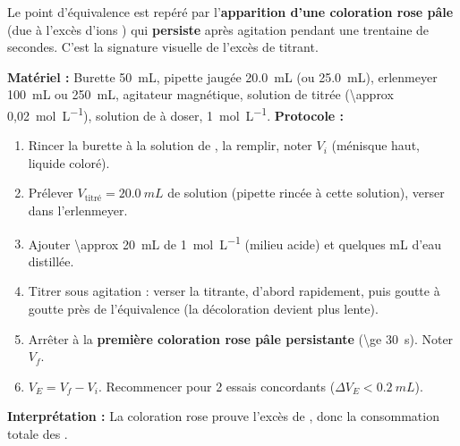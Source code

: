 \documentclass[11pt]{article}
\begin{document}
\begin{aretenir}
Le point d'équivalence est repéré par l'\textbf{apparition d'une coloration rose pâle} (due à l'excès d'ions ) qui \textbf{persiste} après agitation pendant une trentaine de secondes. C'est la signature visuelle de l'excès de titrant.
\end{aretenir}

\begin{experience}
\textbf{Matériel :} Burette \SI{50}{mL}, pipette jaugée \SI{20,0}{mL} (ou \SI{25,0}{mL}), erlenmeyer \SI{100}{mL} ou \SI{250}{mL}, agitateur magnétique, solution de  titrée (\SI{\approx 0,02}{mol.L^{-1}}), solution de  à doser,  \SI{1}{mol.L^{-1}}.
\textbf{Protocole :}
\begin{enumerate}
\item Rincer la burette à la solution de , la remplir, noter $V_i$ (ménisque haut, liquide coloré).
\item Prélever $V_{\text{titré}} = \SI{20,0}{mL}$ de solution  (pipette rincée à cette solution), verser dans l'erlenmeyer.
\item Ajouter \SI{\approx 20}{mL} de  \SI{1}{mol.L^{-1}} (milieu acide) et quelques mL d'eau distillée.
\item Titrer sous agitation : verser la titrante, d'abord rapidement, puis goutte à goutte près de l'équivalence (la décoloration devient plus lente).
\item Arrêter à la \textbf{première coloration rose pâle persistante} (\SI{\ge 30}{s}). Noter $V_f$.
\item $V_E = V_f - V_i$. Recommencer pour 2 essais concordants ($\Delta V_E < \SI{0,2}{mL}$).
\end{enumerate}
\textbf{Interprétation :} La coloration rose prouve l'excès de , donc la consommation totale des .
\end{experience}
\end{document}
